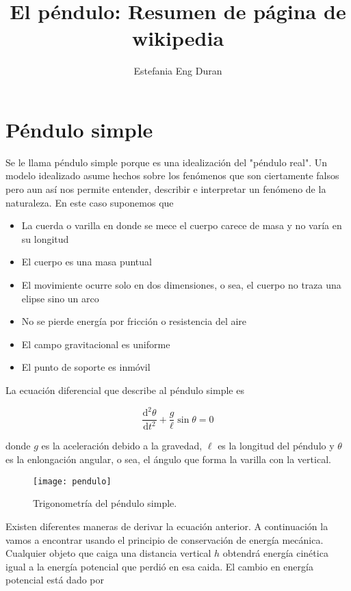 \documentclass[12pt,spanish]{article}
\title{El péndulo: Resumen de página de wikipedia}
\author{Estefania Eng Duran}
\begin{document}
\maketitle

\section{Péndulo simple}

Se le llama péndulo simple porque es una idealización del "péndulo real". Un modelo idealizado  asume hechos sobre los fenómenos que son ciertamente falsos pero aun así nos permite entender, describir e interpretar un fenómeno de la naturaleza. En este caso suponemos que

    \begin{itemize}
      \item La cuerda o varilla en donde se mece el cuerpo carece de masa y no varía en su longitud
      \item El cuerpo es una masa puntual
      \item El movimiente ocurre solo en dos dimensiones, o sea, el cuerpo no traza una elipse sino un arco
      \item No se pierde energía por fricción o resistencia del aire
      \item El campo gravitacional es uniforme
      \item El punto de soporte es inmóvil
    \end{itemize}

La ecuación diferencial que describe al péndulo simple es

 \begin{equation}
    \frac{\mathrm d^2 \theta}{\mathrm d t^2} + \frac{g}{\ell} \sin \theta =  0
 \end{equation}

donde $g$ es la aceleración debido a la gravedad, $\ell$ es la longitud del péndulo y $\theta$ es la enlongación angular, o sea, el ángulo que forma la varilla con la vertical.

 \begin{figure}[ht]
   \centering
     \texttt{[image: pendulo]}
   \caption{Trigonometría del péndulo simple.}
 \end{figure}

Existen diferentes maneras de derivar la ecuación anterior. A continuación la vamos a encontrar usando el principio de conservación de energía mecánica. Cualquier objeto que caiga una distancia vertical $h$ obtendrá energía cinética igual a la energía potencial que perdió en esa caida. El cambio en energía potencial está dado por 
\end{document}
